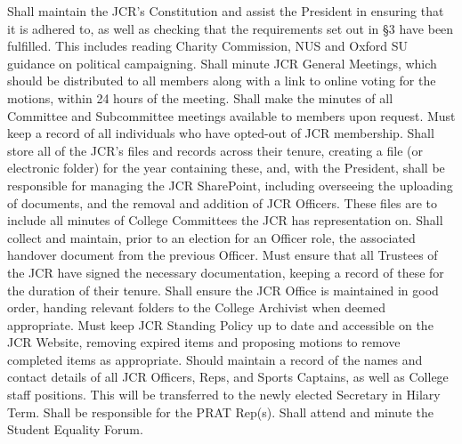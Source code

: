 Shall maintain the JCR's Constitution and assist the President in ensuring that it is adhered to, as well as checking that the requirements set out in §3 have been fulfilled. This includes reading Charity Commission, NUS and Oxford SU guidance on political campaigning.
Shall minute JCR General Meetings, which should be distributed to all members along with a link to online voting for the motions, within 24 hours of the meeting. 
Shall make the minutes of all Committee and Subcommittee meetings available to members upon request.
Must keep a record of all individuals who have opted-out of JCR membership.
Shall store all of the JCR's files and records across their tenure, creating a file (or electronic folder) for the year containing these, and, with the President, shall be responsible for managing the JCR SharePoint, including overseeing the uploading of documents, and the removal and addition of JCR Officers. These files are to include all minutes of College Committees the JCR has representation on.
Shall collect and maintain, prior to an election for an Officer role, the associated handover document from the previous Officer.
Must ensure that all Trustees of the JCR have signed the necessary documentation, keeping a record of these for the duration of their tenure.
Shall ensure the JCR Office is maintained in good order, handing relevant folders to the College Archivist when deemed appropriate.
Must keep JCR Standing Policy up to date and accessible on the JCR Website, removing expired items and proposing motions to remove completed items as appropriate.
Should maintain a record of the names and contact details of all JCR Officers, Reps, and Sports Captains, as well as College staff positions. This will be transferred to the newly elected Secretary in Hilary Term.
Shall be responsible for the PRAT Rep(s).
Shall attend and minute the Student Equality Forum.
